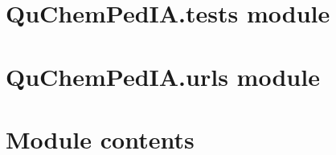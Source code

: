 \documentclass[letterpaper,10pt,english]{sphinxmanual}
\begin{document}
\chapter{QuChemPedIA.tests module}
\label{\detokenize{QuChemPedIA:module-QuChemPedIA.tests}}\label{\detokenize{QuChemPedIA:quchempedia-tests-module}}

\chapter{QuChemPedIA.urls module}
\label{\detokenize{QuChemPedIA:module-QuChemPedIA.urls}}\label{\detokenize{QuChemPedIA:quchempedia-urls-module}}

\chapter{Module contents}
\label{\detokenize{QuChemPedIA:module-QuChemPedIA}}\label{\detokenize{QuChemPedIA:module-contents}}
\end{document}
